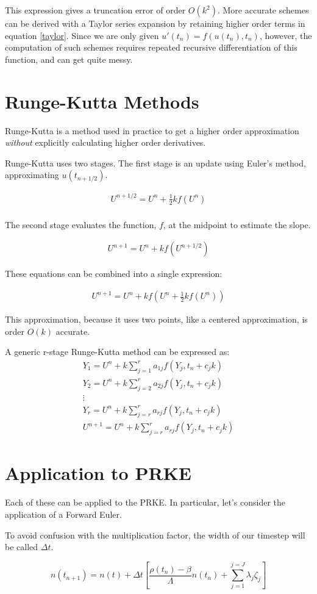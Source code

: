 \documentclass[12pt]{article}
\begin{document}
This expression gives a truncation error of order $O(k^2)$. More 
accurate schemes can be derived with a Taylor series expansion by retaining 
higher order terms in equation \eqref{taylor}. Since we are only given 
$u'(t_n) = f(u(t_n),t_n)$, however, the computation of such schemes requires 
repeated recursive differentiation of this function, and can get quite messy.


\section{Runge-Kutta Methods}

Runge-Kutta is a method used in practice to get a higher order approximation 
\emph{without} explicitly calculating higher order derivatives.

Runge-Kutta uses two stages. The first stage is an update using Euler's method, 
approximating $u(t_{n+1/2})$. 

\begin{align}
U^{n+1/2} = U^n + \frac{1}{2}kf(U^n)\\
\end{align}

The second stage evaluates the function, $f$, at the midpoint to estimate the 
slope.

\begin{align}
U^{n+1} = U^n + kf(U^{n+1/2})
\end{align}

These equations can be combined into a single expression:

\begin{align}
U^{n+1} = U^n + kf(U^n + \frac{1}{2}kf(U^n))
\end{align}

This approximation, because it uses two points, like a centered approximation, 
is order $O(k)$ accurate.

A generic r-stage Runge-Kutta method can be expressed as:
\begin{align}
Y_1 = U^n + k\sum_{j=1}^r a_{1j}f(Y_j, t_n + c_jk)\\
Y_2 = U^n + k\sum_{j=2}^r a_{2j}f(Y_j, t_n + c_jk)\\
\vdots\nonumber\\
Y_r = U^n + k\sum_{j=r}^r a_{rj}f(Y_j, t_n + c_jk)\\
U^{n+1} = U^n + k\sum_{j=r}^r a_{rj}f(Y_j, t_n + c_jk)
\end{align}



\section{Application to PRKE}

Each of these can be applied to the PRKE. In particular, let's consider the 
application of a Forward Euler.

To avoid confusion with the multiplication factor, the width of our timestep will be called $\Delta t$.

\begin{equation}
n(t_{n+1}) = n(t) + \Delta t\left[\frac{\rho(t_n)-\beta}{\Lambda}n(t_n) + \displaystyle\sum^{j=J}_{j=1}\lambda_j\zeta_j\right]
\end{equation}
\end{document}
